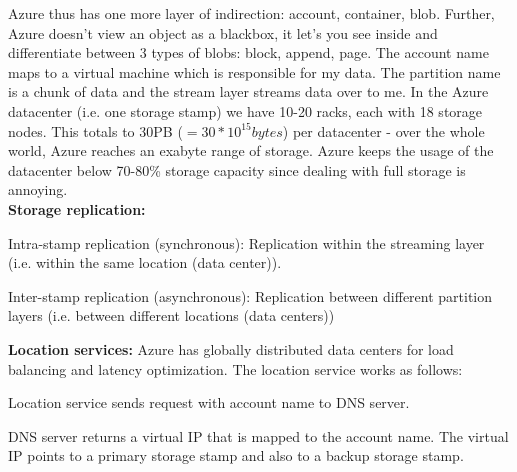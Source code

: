 \documentclass[11pt,oneside,a4paper]{article}
\begin{document}
Azure thus has one more layer of indirection: account, container, blob. Further, Azure doesn't view an object as a blackbox, it let's you see inside and differentiate between 3 types of blobs: block, append, page. The account name maps to a virtual machine which is responsible for my data. The partition name is a chunk of data and the stream layer streams data over to me. In the Azure datacenter (i.e. one storage stamp) we have 10-20 racks, each with 18 storage nodes. This totals to 30PB ($= 30*10^{15} bytes$) per datacenter - over the whole world, Azure reaches an exabyte range of storage. Azure keeps the usage of the datacenter below 70-80\% storage capacity since dealing with full storage is annoying.\\

\textbf{Storage replication:}

\begin{compactitem}
	\item Intra-stamp replication (synchronous): Replication within the streaming layer (i.e. within the same location (data center)).
	\item Inter-stamp replication (asynchronous): Replication between different partition layers (i.e. between different locations (data centers))\\
\end{compactitem}

\textbf{Location services:} Azure has globally distributed data centers for load balancing and latency optimization. The location service works as follows:

\begin{compactenum}
	\item Location service sends request with account name to DNS server.
	\item DNS server returns a virtual IP that is mapped to the account name. The virtual IP points to a primary storage stamp and also to a backup storage stamp.
\end{compactenum}
\end{document}
